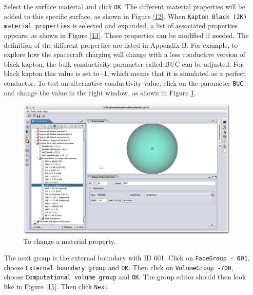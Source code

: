 \documentclass[a4paper, 12pt]{article}
\begin{document}
Select the surface material and click \verb|OK|. The different material properties will be added to this specific surface, as shown in Figure \ref{12}. When \verb|Kapton Black (2K) material properties| is selected and expanded, a list of associated properties appears, as shown in Figure \ref{13}. These properties can be modified if needed. The definition of the different properties are listed in Appendix B. For example, to explore how the spacecraft charging will change with a less conductive version of black kapton, the bulk conductivity parameter called BUC can be adjusted. For black kapton this value is set to -1, which means that it is simulated as a perfect conductor. To test an alternative conductivity value, click on the parameter \verb|BUC| and change the value in the right window, as shown in Figure \ref{14}.\\


\begin{figure}[!ht]
    \centering
    \includegraphics[width=1\textwidth]{fig14.jpg}
    \caption{To change a material property.}
    \label{14}
\end{figure}

The next group is the external boundary with ID 601. Click on \verb|FaceGroup - 601|,  choose \verb|External boundary group| and \verb|OK|. Then click on \verb|VolumeGroup -700|, choose \verb|Computational volume group| and \verb|OK|. The group editor should then look like in Figure \ref{15}. Then click \verb|Next|.
\end{document}

